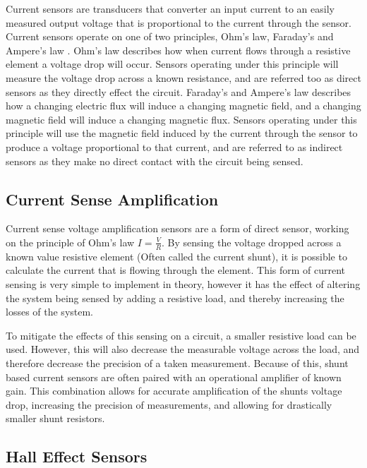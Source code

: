 Current sensors are transducers that converter an input current to an easily measured output voltage that is proportional to the current through the sensor. Current sensors operate on one of two principles, Ohm's law, Faraday’s and Ampere’s law \cite{current_sensor_types}.  Ohm's law describes how when current flows through a resistive element a voltage drop will occur. Sensors operating under this principle will measure the voltage drop across a known resistance, and are referred too as direct sensors as they directly effect the circuit. Faraday’s and Ampere’s law describes how a changing electric flux will induce a changing magnetic field, and a changing magnetic field will induce a changing magnetic flux. Sensors operating under this principle will use the magnetic field induced by the current through the sensor to produce a voltage proportional to that current, and are referred to as indirect sensors as they make no direct contact with the circuit being sensed. 


\subsection{Current Sense Amplification}\label{S:current_shunt_back}

Current sense voltage amplification sensors are a form of direct sensor, working on the principle of Ohm's law $I=\frac{V}{R}$. By sensing the voltage dropped across a known value resistive element (Often called the current shunt), it is possible to calculate the current that is flowing through the element. This form of current sensing is very simple to implement in theory, however it has the effect of altering the system being sensed by adding a resistive load, and thereby increasing the losses of the system. 

To mitigate the effects of this sensing on a circuit, a smaller resistive load can be used. However, this will also decrease the measurable voltage across the load, and therefore decrease the precision of a taken measurement. Because of this, shunt based current sensors are often paired with an operational amplifier of known gain. This combination allows for accurate amplification of the shunts voltage drop, increasing the precision of measurements, and allowing for drastically smaller shunt resistors. 


\subsection{Hall Effect Sensors}\label{S:hall_effect_back}

